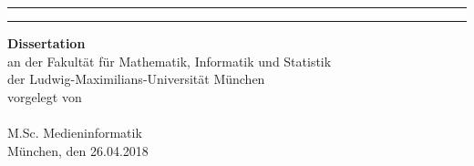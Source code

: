 \documentclass[12pt,a4paper,twoside]{book}
\begin{document}
{\begin{minipage}{188mm}
		\begin{center}
			\vspace*{20mm}
			\rule{\textwidth}{0.5pt}
			\vskip 5mm
			\fontsize{28}{34}\rmfamily\scshape\mytitle
			\par
			\rule{\textwidth}{0.5pt}
			\vskip 20mm
			\huge \textbf{Dissertation}\\ 
			\vspace*{5mm}
			\normalfont\Large an der Fakultät für Mathematik, Informatik und Statistik\\
			der Ludwig-Maximilians-Universität München\\
			\vspace*{10mm}
			vorgelegt von\\
			\vspace*{10mm}
			{\huge\scshape\textbf{\myname}}\\
			\vspace*{2mm}
			M.Sc. Medieninformatik\\ 
			\vspace*{20mm}
			\normalfont\Large München, den 26.04.2018 
		\end{center}
	\end{minipage}
	
	\clearpage
	
}

\pagestyle{fancy}%
\restoregeometry
\end{document}
